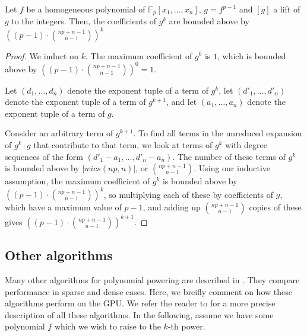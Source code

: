 \begin{thm}
    Let $f$ be a homogeneous polynomial of $\mathbb{F}_p[x_1, \dots, x_n]$, $g = f ^ {p - 1}$ and $[g]$ a lift of $g$ to the integers. Then, the coefficients of $g ^ k$ are bounded above by $((p - 1) \cdot \binom{np + n - 1}{n - 1}) ^ k$
\end{thm}

\begin{proof}
    We induct on $k$. The maximum coefficient of $g^0$ is $1$, which is bounded above by $((p - 1) \cdot \binom{np + n - 1}{n - 1}) ^ 0 = 1$.
    
    Let $(d_1, \dots , d_n)$ denote the exponent tuple of a term of $g^k$, let $(d'_1, \dots , d'_n)$ denote the exponent tuple of a term of $g^{k + 1}$, and let $(a_1, \dots , a_n)$ denote the exponent tuple of a term of $g$.

    Consider an arbitrary term of $g^{k + 1}$. To find all terms in the unreduced expansion of $g^k \cdot g$ that contribute to that term, we look at terms of $g^k$ with degree sequences of the form $(d'_1 - a_1, \dots , d'_n - a_n)$. The number of these terms of $g^k$ is bounded above by $|wics(np, n)|$, or $\binom{np + n - 1}{n - 1}$. Using our inductive assumption, the maximum coefficient of $g^k$ is bounded above by $((p - 1) \cdot \binom{np + n - 1}{n - 1}) ^ k$, so multiplying each of these by coefficients of $g$, which have a maximum value of $p - 1$, and adding up $\binom{np + n - 1}{n - 1}$ copies of these gives $((p - 1) \cdot \binom{np + n - 1}{n - 1}) ^ {k + 1}$.
\end{proof}


\subsection{Other algorithms}

Many other algorithms 
for polynomial powering
are described in \cite{monagan-2012-sparse-powering}. 
They compare performance in sparse and dense cases. 
Here, we breifly comment on how these algorithms perform on the GPU.
We refer the reader to \cite{monagan-2012-sparse-powering}
for a more precise description of all these algorithms.
In the following, assume we have some polynomial \(f\) which we wish 
to raise to the \(k\)-th power.

